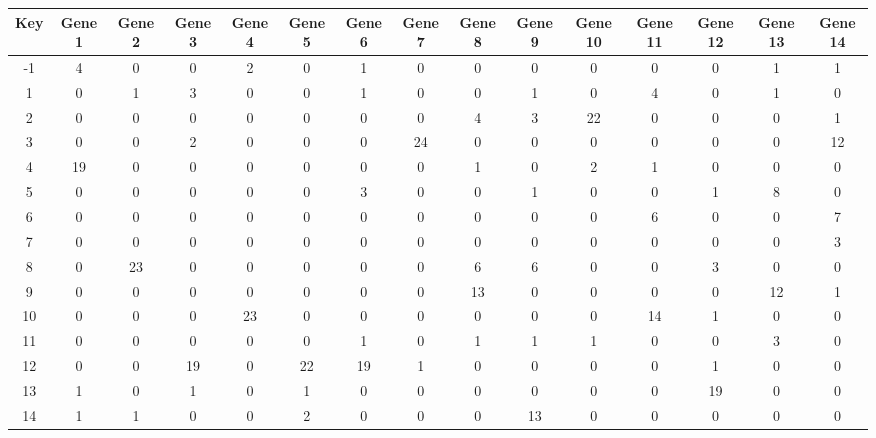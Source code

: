 \begin{tabular}{|c|c|c|c|c|c|c|c|c|c|c|c|c|c|c|}
\hline
Key & Gene 1 & Gene 2 & Gene 3 & Gene 4 & Gene 5 & Gene 6 & Gene 7 & Gene 8 & Gene 9 & Gene 10 & Gene 11 & Gene 12 & Gene 13 & Gene 14 \\
\hline
-1 & 4 & 0 & 0 & 2 & 0 & 1 & 0 & 0 & 0 & 0 & 0 & 0 & 1 & 1 \\
1 & 0 & 1 & 3 & 0 & 0 & 1 & 0 & 0 & 1 & 0 & 4 & 0 & 1 & 0 \\
2 & 0 & 0 & 0 & 0 & 0 & 0 & 0 & 4 & 3 & 22 & 0 & 0 & 0 & 1 \\
3 & 0 & 0 & 2 & 0 & 0 & 0 & 24 & 0 & 0 & 0 & 0 & 0 & 0 & 12 \\
4 & 19 & 0 & 0 & 0 & 0 & 0 & 0 & 1 & 0 & 2 & 1 & 0 & 0 & 0 \\
5 & 0 & 0 & 0 & 0 & 0 & 3 & 0 & 0 & 1 & 0 & 0 & 1 & 8 & 0 \\
6 & 0 & 0 & 0 & 0 & 0 & 0 & 0 & 0 & 0 & 0 & 6 & 0 & 0 & 7 \\
7 & 0 & 0 & 0 & 0 & 0 & 0 & 0 & 0 & 0 & 0 & 0 & 0 & 0 & 3 \\
8 & 0 & 23 & 0 & 0 & 0 & 0 & 0 & 6 & 6 & 0 & 0 & 3 & 0 & 0 \\
9 & 0 & 0 & 0 & 0 & 0 & 0 & 0 & 13 & 0 & 0 & 0 & 0 & 12 & 1 \\
10 & 0 & 0 & 0 & 23 & 0 & 0 & 0 & 0 & 0 & 0 & 14 & 1 & 0 & 0 \\
11 & 0 & 0 & 0 & 0 & 0 & 1 & 0 & 1 & 1 & 1 & 0 & 0 & 3 & 0 \\
12 & 0 & 0 & 19 & 0 & 22 & 19 & 1 & 0 & 0 & 0 & 0 & 1 & 0 & 0 \\
13 & 1 & 0 & 1 & 0 & 1 & 0 & 0 & 0 & 0 & 0 & 0 & 19 & 0 & 0 \\
14 & 1 & 1 & 0 & 0 & 2 & 0 & 0 & 0 & 13 & 0 & 0 & 0 & 0 & 0 \\
\hline
\end{tabular}